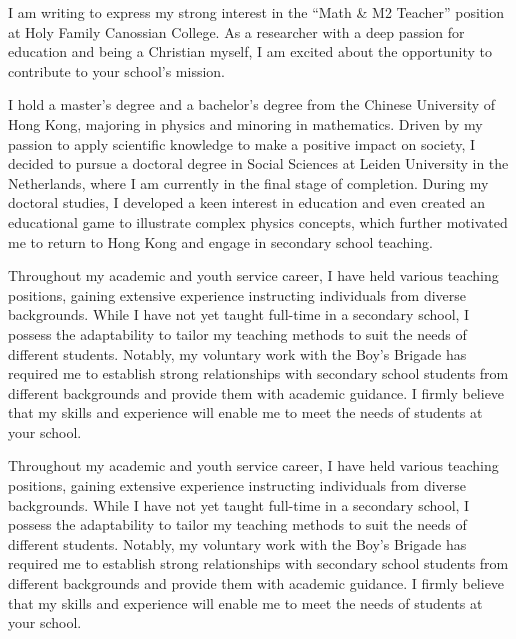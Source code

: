 \documentclass[11pt, a4paper]{awesome-cv}
\begin{document}
\makecvheader[R]

\makecvfooter
  {}%
  {}%
  {}

\makelettertitle

\begin{cvletter}

I am writing to express my strong interest in the ``Math \& M2 Teacher'' position at Holy Family Canossian College. As a researcher with a deep passion for education and being a Christian myself, I am excited about the opportunity to contribute to your school's mission.

I hold a master's degree and a bachelor's degree from the Chinese University of Hong Kong, majoring in physics and minoring in mathematics. Driven by my passion to apply scientific knowledge to make a positive impact on society, I decided to pursue a doctoral degree in Social Sciences at Leiden University in the Netherlands, where I am currently in the final stage of completion. During my doctoral studies, I developed a keen interest in education and even created an educational game to illustrate complex physics concepts, which further motivated me to return to Hong Kong and engage in secondary school teaching.

Throughout my academic and youth service career, I have held various teaching positions, gaining extensive experience instructing individuals from diverse backgrounds. While I have not yet taught full-time in a secondary school,  I possess the adaptability to tailor my teaching methods to suit the needs of different students. Notably, my voluntary work with the Boy's Brigade has required me to establish strong relationships with secondary school students from different backgrounds and provide them with academic guidance. I firmly believe that my skills and experience will enable me to meet the needs of students at your school.

Throughout my academic and youth service career, I have held various teaching positions, gaining extensive experience instructing individuals from diverse backgrounds. While I have not yet taught full-time in a secondary school, I possess the adaptability to tailor my teaching methods to suit the needs of different students. Notably, my voluntary work with the Boy's Brigade has required me to establish strong relationships with secondary school students from different backgrounds and provide them with academic guidance. I firmly believe that my skills and experience will enable me to meet the needs of students at your school.


\end{cvletter}
\end{document}
